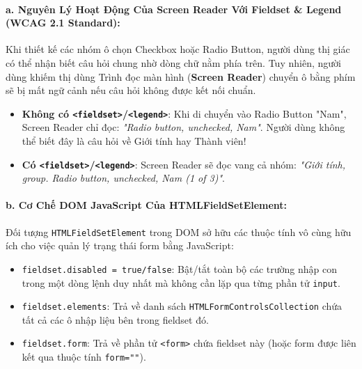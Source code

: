 \documentclass[11pt,oneside]{book}
\newcommand{\codeinline}[1]{\textcolor{accentOrange}{\texttt{#1}}}
\newcommand{\term}[1]{\textbf{\textcolor{primaryBlue}{#1}}}
\newcommand{\badge}[1]{\tcbox[on line, arc=3pt, colback=primaryBlue!10, colframe=primaryBlue!30, boxsep=1pt, left=3pt, right=3pt, top=1pt, bottom=1pt]{\small\sffamily\color{primaryBlue}#1}}
\begin{document}
\paragraph{a. Nguyên Lý Hoạt Động Của Screen Reader Với Fieldset \& Legend (WCAG 2.1 Standard):}
Khi thiết kế các nhóm ô chọn Checkbox hoặc Radio Button, người dùng thị giác có thể nhận biết câu hỏi chung nhờ dòng chữ nằm phía trên. Tuy nhiên, người dùng khiếm thị dùng Trình đọc màn hình (\term{Screen Reader}) chuyển ô bằng phím \badge{Tab} sẽ bị mất ngữ cảnh nếu câu hỏi không được kết nối chuẩn.
\begin{itemize}[leftmargin=1.5em, itemsep=3pt, parsep=0pt]
    \item \textbf{Không có \codeinline{<fieldset>}/\codeinline{<legend>}}: Khi di chuyển vào Radio Button "Nam", Screen Reader chỉ đọc: \textit{"Radio button, unchecked, Nam"}. Người dùng không thể biết đây là câu hỏi về Giới tính hay Thành viên!
    \item \textbf{Có \codeinline{<fieldset>}/\codeinline{<legend>}}: Screen Reader sẽ đọc vang cả nhóm: \textit{"Giới tính, group. Radio button, unchecked, Nam (1 of 3)"}.
\end{itemize}

\paragraph{b. Cơ Chế DOM JavaScript Của HTMLFieldSetElement:}
Đối tượng \codeinline{HTMLFieldSetElement} trong DOM sở hữu các thuộc tính vô cùng hữu ích cho việc quản lý trạng thái form bằng JavaScript:
\begin{itemize}[leftmargin=1.5em, itemsep=3pt, parsep=0pt]
    \item \codeinline{fieldset.disabled = true/false}: Bật/tắt toàn bộ các trường nhập con trong một dòng lệnh duy nhất mà không cần lặp qua từng phần tử \codeinline{input}.
    \item \codeinline{fieldset.elements}: Trả về danh sách \codeinline{HTMLFormControlsCollection} chứa tất cả các ô nhập liệu bên trong fieldset đó.
    \item \codeinline{fieldset.form}: Trả về phần tử \codeinline{<form>} chứa fieldset này (hoặc form được liên kết qua thuộc tính \codeinline{form=""}).
\end{itemize}
\end{document}
